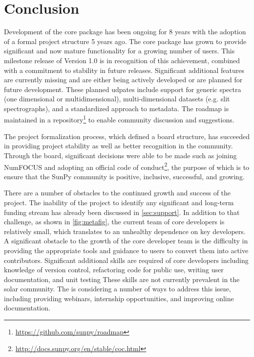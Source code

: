 \section{Conclusion}
\label{sec:conclusion}

Development of the \sunpypkg core package has been ongoing for 8 years with the adoption of a formal project structure 5 years ago.
The core package has grown to provide significant and now mature functionality for a growing number of users.
This milestone release of Version 1.0 is in recognition of this achievement, combined with a commitment to stability in future releases.
Significant additional features are currently missing and are either being actively developed or are planned for future development.
These planned udpates include support for generic spectra (one dimensional or multidimensional), multi-dimensional datasets (e.g. slit spectrographs), and a standardized approach to metadata. The roadmap is maintained in a repository\footnote{\url{https://github.com/sunpy/roadmap}} to enable community discussion and suggestions.

The project formalization process, which defined a board structure, has succeeded in providing project stability as well as better recognition in the community.
Through the board, significant decisions were able to be made such as joining NumFOCUS and adopting an official code of conduct\footnote{\url{http://docs.sunpy.org/en/stable/coc.html}}, the purpose of which is to ensure that the SunPy community is positive, inclusive, successful, and growing.

There are a number of obstacles to the continued growth and success of the project. The inability of the project to identify any significant and long-term funding stream has already been discussed in \autoref{sec:support}.
In addition to that challenge, as shown in \autoref{fig:metafig}, the current team of core developers is relatively small, which translates to an unhealthy dependence on key developers.
A significant obstacle to the growth of the core developer team is the difficulty in providing the appropriate tools and guidance to users to convert them into active contributors.
Significant additional skills are required of core developers including knowledge of version control, refactoring code for public use, writing user documentation, and unit testing
These skills are not currently prevalent in the solar community.
The \sunpyproj is considering a number of ways to address this issue, including providing webinars, internship opportunities, and improving online documentation.

